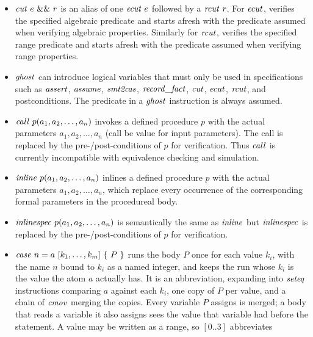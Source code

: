 \documentclass{article}
\begin{document}
\begin{itemize}
  then assumes it, and so is an alias of one $\iassert\ e\ \band\ r$
  followed by one $\iassume\ e\ \band\ r$.
  Writing the two by hand instead states the predicate twice, and
  nothing checks that the assumption, which is trusted, says no more
  than what was verified.
  The prove-with clauses say how to verify the predicate, not what it
  says, and so are dropped from the assumption.
\item $\mathit{cut}\ e\ \&\&\ r$ is an alias of one $\mathit{ecut}\ e$ followed by
  a $\mathit{rcut}\ r$.
  For $\mathit{ecut}$, \cryptoline verifies the specified algebraic predicate
  and starts afresh with the predicate assumed when verifying algebraic
  properties.
  Similarly for $\mathit{rcut}$, \cryptoline verifies the specified range
  predicate and starts afresh with the predicate assumed when verifying
  range properties.
\item $\mathit{ghost}$ can introduce logical variables that must only be used
  in specifications such as $\mathit{assert}$, $\mathit{assume}$, $\mathit{smt2cas}$,
  $\mathit{record\_fact}$, $\mathit{cut}$, $\mathit{ecut}$, $\mathit{rcut}$, and postconditions.
  The predicate in a $\mathit{ghost}$ instruction is always assumed.
\item $\mathit{call}\ p(a_1, a_2, \ldots, a_n)$ invokes a defined
  procedure $p$ with the actual parameters $a_1, a_2, \ldots, a_n$
  (call be value for input parameters).
  The call is replaced by the pre-/post-conditions of $p$ for
  verification.
  Thus $\mathit{call}$ is currently incompatible with equivalence checking
  and simulation.
\item $\mathit{inline}\ p(a_1, a_2, \ldots, a_n)$ inlines a defined
  procedure $p$ with the actual parameters $a_1, a_2, \ldots, a_n$,
  which replace every occurrence of the corresponding formal
  parameters in the procedureal body.
\item $\mathit{inlinespec}\ p(a_1, a_2, \ldots, a_n)$ is semantically the
  same as $\mathit{inline}$ but $\mathit{inlinespec}$ is replaced by the
  pre-/post-conditions of $p$ for verification.
\item $\icase\ n = a\ [k_1, \ldots, k_m]\ \{\ P\ \}$ runs the body $P$
  once for each value $k_i$, with the name $n$ bound to $k_i$ as a
  named integer, and keeps the run whose $k_i$ is the value the atom
  $a$ actually has.
  It is an abbreviation, expanding into $\mathit{seteq}$ instructions
  comparing $a$ against each $k_i$, one copy of $P$ per value, and a
  chain of $\mathit{cmov}$ merging the copies.
  Every variable $P$ assigns is merged; a body that reads a variable it
  also assigns sees the value that variable had before the statement.
  A value may be written as a range, so $[0 .. 3]$ abbreviates

\end{itemize}
\end{document}
